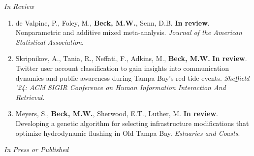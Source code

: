 \documentclass[letterpaper,12pt]{article}
\newcommand{\subsectitle}[1]{\vspace{\baselineskip} \centerline{\normalsize{\textit{#1}}}}
\begin{document}
\subsectitle{In Review}

\begin{enumerate}

\item de Valpine, P., Foley, M., \textbf{Beck, M.W.}, Senn, D.B. \textbf{In review}. Nonparametric and additive mixed meta-analysis. \textit{Journal of the American Statistical Association}.

\item Skripnikov, A., Tania, R., Neffati, F., Adkins, M., \textbf{Beck, M.W.} \textbf{In review}. Twitter user account classification to gain insights into communication dynamics and public awareness during Tampa Bay's red tide events. \textit{Sheffield ’24: ACM SIGIR Conference on Human Information Interaction And Retrieval}.

\item Meyers, S., \textbf{Beck, M.W.}, Sherwood, E.T., Luther, M. \textbf{In review}. Developing a genetic algorithm for selecting infrastructure modifications that optimize hydrodynamic flushing in Old Tampa Bay. \textit{Estuaries and Coasts}.
%

\end{enumerate}

\subsectitle{In Press or Published}
\end{document}
